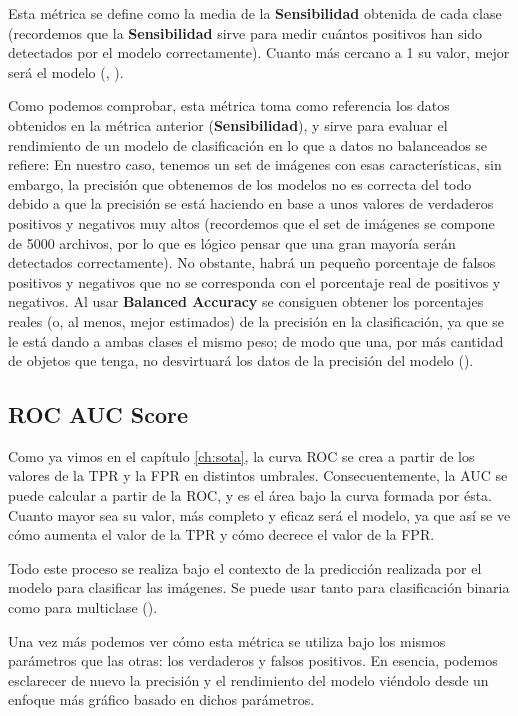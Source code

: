 Esta métrica se define como la media de la \textbf{Sensibilidad} obtenida de cada clase (recordemos que la \textbf{Sensibilidad} sirve para medir cuántos positivos han sido detectados por el modelo correctamente). Cuanto más cercano a 1 su valor, mejor será el modelo (\cite{balanced-accuracy}, \cite{balanced-accuracy-2}). %

Como podemos comprobar, esta métrica toma como referencia los datos obtenidos en la métrica anterior (\textbf{Sensibilidad}), y sirve para evaluar el rendimiento de un modelo de clasificación en lo que a datos no balanceados se refiere: En nuestro caso, tenemos un set de imágenes con esas características, sin embargo, la precisión que obtenemos de los modelos no es correcta del todo debido a que la precisión se está haciendo en base a unos valores de verdaderos positivos y negativos muy altos (recordemos que el set de imágenes se compone de 5000 archivos, por lo que es lógico pensar que una gran mayoría serán detectados correctamente). No obstante, habrá un pequeño porcentaje de falsos positivos y negativos que no se corresponda con el porcentaje real de positivos y negativos. Al usar \textbf{Balanced Accuracy} se consiguen obtener los porcentajes reales (o, al menos, mejor estimados) de la precisión en la clasificación, ya que se le está dando a ambas clases el mismo peso; de modo que una, por más cantidad de objetos que tenga, no desvirtuará los datos de la precisión del modelo (\cite{balanced-accuracy-3}).

\subsection{ROC AUC Score}

Como ya vimos en el capítulo \ref{ch:sota}, la curva \ac{ROC} se crea a partir de los valores de la \ac{TPR} y la \ac{FPR} en distintos umbrales. Consecuentemente, la \ac{AUC} se puede calcular a partir de la \ac{ROC}, y es el área bajo la curva formada por ésta. Cuanto mayor sea su valor, más completo y eficaz será el modelo, ya que así se ve cómo aumenta el valor de la \ac{TPR} y cómo decrece el valor de la \ac{FPR}.

Todo este proceso se realiza bajo el contexto de la predicción realizada por el modelo para clasificar las imágenes. Se puede usar tanto para clasificación binaria como para multiclase (\cite{roc-auc-score}). %

Una vez más podemos ver cómo esta métrica se utiliza bajo los mismos parámetros que las otras: los verdaderos y falsos positivos. En esencia, podemos esclarecer de nuevo la precisión y el rendimiento del modelo viéndolo desde un enfoque más gráfico basado en dichos parámetros.

